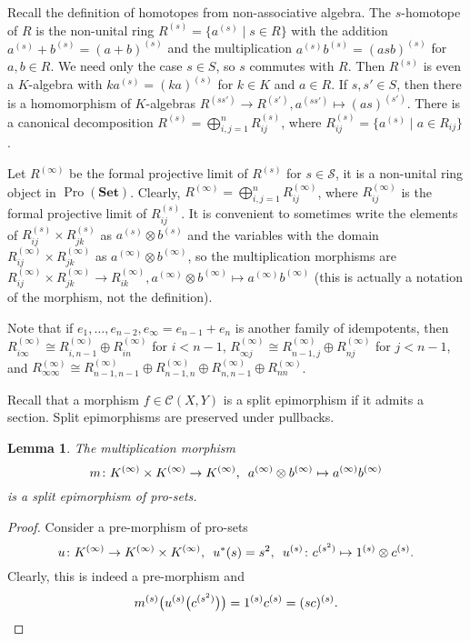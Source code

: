 \documentclass{article}
\newtheorem{lemma}{Lemma}
\newcommand{\rar}{\rightarrow}
\newcommand{\Set}{\mathbf{Set}}
\DeclareMathOperator{\Pro}{Pro}
\begin{document}
Recall the definition of homotopes from non-associative algebra. The \(s\)-homotope of \(R\) is the non-unital ring \(R^{(s)} = \{a^{(s)} \mid s \in R\}\) with the addition \(a^{(s)} + b^{(s)} = (a + b)^{(s)}\) and the multiplication \(a^{(s)} b^{(s)} = (asb)^{(s)}\) for \(a, b \in R\). We need only the case \(s \in S\), so \(s\) commutes with \(R\). Then \(R^{(s)}\) is even a \(K\)-algebra with \(ka^{(s)} = (ka)^{(s)}\) for \(k \in K\) and \(a \in R\). If \(s, s' \in S\), then there is a homomorphism of \(K\)-algebras \(R^{(ss')} \rar R^{(s')}, a^{(ss')} \mapsto (as)^{(s')}\). There is a canonical decomposition \(R^{(s)} = \bigoplus_{i, j = 1}^n R^{(s)}_{ij}\), where \(R^{(s)}_{ij} = \{a^{(s)} \mid a \in R_{ij}\}\).

Let \(R^{(\infty)}\) be the formal projective limit of \(R^{(s)}\) for \(s \in \mathcal S\), it is a non-unital ring object in \(\Pro(\Set)\). Clearly, \(R^{(\infty)} = \bigoplus_{i, j = 1}^n R^{(\infty)}_{ij}\), where \(R^{(\infty)}_{ij}\) is the formal projective limit of \(R^{(s)}_{ij}\). It is convenient to sometimes write the elements of \(R_{ij}^{(s)} \times R_{jk}^{(s)}\) as \(a^{(s)} \otimes b^{(s)}\) and the variables with the domain \(R_{ij}^{(\infty)} \times R_{jk}^{(\infty)}\) as \(a^{(\infty)} \otimes b^{(\infty)}\), so the multiplication morphisms are \(R_{ij}^{(\infty)} \times R_{jk}^{(\infty)} \rar R_{ik}^{(\infty)}, a^{(\infty)} \otimes b^{(\infty)} \mapsto a^{(\infty)} b^{(\infty)}\) (this is actually a notation of the morphism, not the definition).

Note that if \(e_1, \ldots, e_{n - 2}, e_\infty = e_{n - 1} + e_n\) is another family of idempotents, then \(R_{i\infty}^{(\infty)} \cong R_{i, n - 1}^{(\infty)} \oplus R_{in}^{(\infty)}\) for \(i < n - 1\), \(R_{\infty j}^{(\infty)} \cong R_{n - 1, j}^{(\infty)} \oplus R_{nj}^{(\infty)}\) for \(j < n - 1\), and \(R_{\infty\infty}^{(\infty)} \cong R_{n - 1, n - 1}^{(\infty)} \oplus R_{n - 1, n}^{(\infty)} \oplus R_{n, n - 1}^{(\infty)} \oplus R_{nn}^{(\infty)}\).

Recall that a morphism \(f \in \mathcal C(X, Y)\) is a split epimorphism if it admits a section. Split epimorphisms are preserved under pullbacks.

\begin{lemma}\label{RingGeneration}
The multiplication morphism
\[m \colon K^{(\infty)} \times K^{(\infty)} \rar K^{(\infty)}, \enskip a^{(\infty)} \otimes b^{(\infty)} \mapsto a^{(\infty)} b^{(\infty)}\]
is a split epimorphism of pro-sets.
\end{lemma}
\begin{proof}
Consider a pre-morphism of pro-sets
\[u \colon K^{(\infty)} \rar K^{(\infty)} \times K^{(\infty)}, \enskip u^*(s) = s^2, \enskip u^{(s)} \colon c^{(s^2)} \mapsto 1^{(s)} \otimes c^{(s)}.\]
Clearly, this is indeed a pre-morphism and
\[
m^{(s)}\bigl(u^{(s)}\bigl(c^{(s^2)}\bigr)\bigr) = 1^{(s)} c^{(s)} = (sc)^{(s)}.\qedhere
\]
\end{proof}
\end{document}
